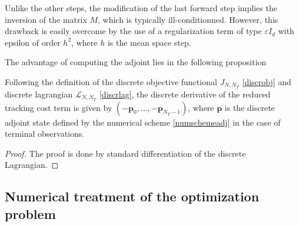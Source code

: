  \begin{rmk}
  Unlike the other steps, the modification of the last forward step implies the inversion of the matrix $M$, which is typically ill-conditionned. However, this drawback is easily overcome by the use of a regularization term of type $\varepsilon I_d$ with epsilon of order $h^2$, where $h$ is the mean space step.
 \end{rmk}

 The advantage of computing the adjoint lies in the following proposition
 \begin{proposition}
 Following the definition of the discrete objective functional $J_{N,N_T}$ \eqref{discrobj} and discrete lagrangian $\mathcal{L}_{N,N_T}$ \eqref{discrlag}, the discrete derivative of the reduced tracking cost term is given by $\left(-\mathbf{p}_0,\ldots,-\mathbf{p}_{N_T-1}\right)$, where $\mathbf{p}$ is the discrete adjoint state defined by the numerical scheme \eqref{numschemeadj} in the case of terminal observations.
 \end{proposition}
\begin{proof}
 The proof is done by standard differentiation of the discrete Lagrangian.
\end{proof}


\subsection{Numerical treatment of the optimization problem}
